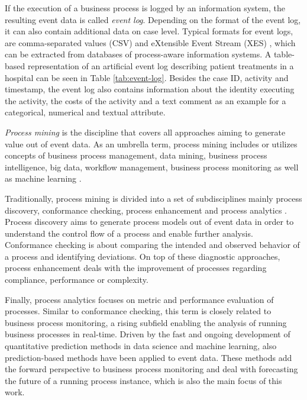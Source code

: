 If the execution of a business process is logged by an information system, the resulting event data is called \textit{event log}.
Depending on the format of the event log, it can also contain additional data on case level.
Typical formats for event logs, are comma-separated values (CSV) and eXtensible Event Stream (XES) \cite{DBLP:conf/caise/VerbeekBDA10a}, which can be extracted from databases of process-aware information systems.
A table-based representation of an artificial event log describing patient treatments in a hospital can be seen in Table \ref{tab:event-log}.
Besides the case ID, activity and timestamp, the event log also contains information about the identity executing the activity, the costs of the activity and a text comment as an example for a categorical, numerical and textual attribute.

\begin{definition}
	\textit{Process mining} is the discipline that covers all approaches aiming to generate value out of event data.
	As an umbrella term, process mining includes or utilizes concepts of business process management, data mining, business process intelligence, big data, workflow management, business process monitoring \cite{DBLP:books/sp/Aalst16} as well as machine learning \cite{DBLP:conf/bpm/VeitGMHT17}.
\end{definition}

Traditionally, process mining is divided into a set of subdisciplines mainly process discovery, conformance checking, process enhancement and process analytics \cite{DBLP:conf/caise/EckLLA15}.
Process discovery aims to generate process models out of event data in order to understand the control flow of a process and enable further analysis.
Conformance checking is about comparing the intended and observed behavior of a process and identifying deviations.
On top of these diagnostic approaches, process enhancement deals with the improvement of processes regarding compliance, performance or complexity.

Finally, process analytics focuses on metric and performance evaluation of processes. Similar to conformance checking, this term is closely related to business process monitoring, a rising subfield enabling the analysis of running business processes in real-time.
Driven by the fast and ongoing development of quantitative prediction methods in data science and machine learning, also prediction-based methods have been applied to event data.
These methods add the forward perspective to business process monitoring and deal with forecasting the future of a running process instance, which is also the main focus of this work.


